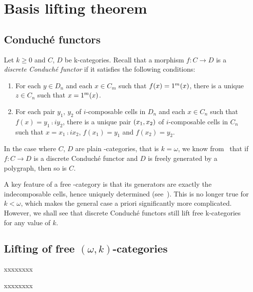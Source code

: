 \section{Basis lifting theorem}\label{sec:basislift}

\subsection{Conduché functors}\label{subsec:conduche}
\begin{paragr}
  Let $k\geq 0$ and $C$, $D$ be \ook k-categories. Recall that a morphism $f:C\to D$ is a {\em discrete Conduché functor} if it satisfies the following conditions:
  \begin{enumerate}
  \item For each $y\in D_n$ and each $x\in C_m$ such that $f(x)=1^{m}(x)$, there is a unique $z\in C_n$ such that $x=1^{m}(x)$.
    \item For each pair $y_1$, $y_2$ of $i$-composable cells in $D_n$ and each $x\in C_n$ such that $f(x)=y_1\comp i y_2$, there is a unique pair $(x_1,x_2)$ of $i$-composable cells in $C_n$ such that $x=x_1\comp i x_2$, $f(x_1)=y_1$ and $f(x_2)=y_2$.
    \end{enumerate}
    In the case where $C$, $D$ are plain \oo-categories, that is $k=\omega$, we know from~\cite[Theorem 6.11]{guetta:poldcf} that if $f:C\to D$ is a discrete Conduché functor and $D$ is freely generated by a polygraph, then so is $C$.
  \end{paragr}
  \begin{remark}
     A key feature of a free \oo-category is that its generators are
     exactly the indecomposable cells, hence uniquely determined
     (see~\cite[Section 4, Proposition 8.3]{makkai:worcom}). This is
     no longer true for $k<\omega$, which makes the general case a
     priori significantly more complicated. However, we shall see that
     discrete Conduché functors still lift free \ook k-categories for any value of $k$.
  \end{remark}
    




\subsection{Lifting of free $(\omega,k)$-categories}\label{subsec:lifting}
\begin{paragr}
  xxxxxxxx
\end{paragr}
\begin{theorem}
  xxxxxxxx
\end{theorem}
